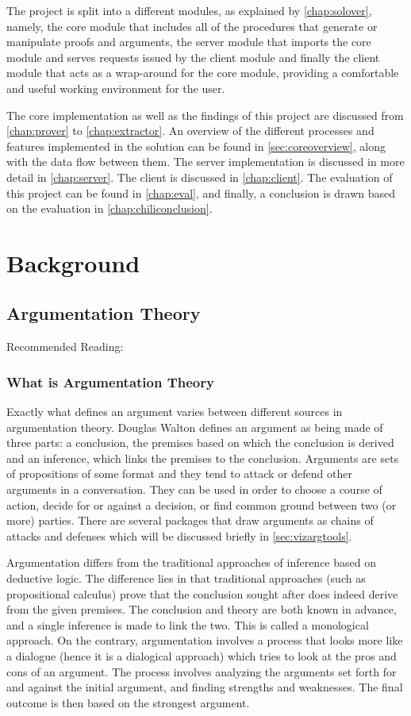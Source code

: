 \documentclass[11pt,twoside,a4paper]{report}
\begin{document}
The project is split into a different modules, as explained by \autoref{chap:solover}, namely, the core module that includes all of the procedures that generate or manipulate proofs and arguments, the server module that imports the core module and serves requests issued by the client module and finally the client module that acts as a wrap-around for the core module, providing a comfortable and useful working environment for the user.

The core implementation as well as the findings of this project are discussed from \autoref{chap:prover} to \autoref{chap:extractor}. An overview of the different processes and features implemented in the solution can be found in \autoref{sec:coreoverview}, along with the data flow between them. The server implementation is discussed in more detail in \autoref{chap:server}. The client is discussed in \autoref{chap:client}. The evaluation of this project can be found in \autoref{chap:eval}, and finally, a conclusion is drawn based on the evaluation in \autoref{chap:chiliconclusion}.

\chapter{Background}
\label{chap:background}

\section{Argumentation Theory}
\label{sec:argtheory}
Recommended Reading: \citep*{argumentationinai}

\subsection{What is Argumentation Theory}
Exactly what defines an argument varies between different sources in argumentation theory. Douglas Walton defines an argument as being made of three parts: a conclusion, the premises based on which the conclusion is derived and an inference, which links the premises to the conclusion. Arguments are sets of propositions of some format and they tend to attack or defend other arguments in a conversation. They can be used in order to choose a course of action, decide for or against a decision, or find common ground between two (or more) parties. There are several packages that draw arguments as chains of attacks and defenses which will be discussed briefly in \autoref{sec:vizargtools}.

Argumentation differs from the traditional approaches of inference based on deductive logic. The difference lies in that traditional approaches (such as propositional calculus) prove that the conclusion sought after does indeed derive from the given premises. The conclusion and theory are both known in advance, and a single inference is made to link the two. This is called a monological approach. On the contrary, argumentation involves a process that looks more like a dialogue (hence it is a dialogical approach) which tries to look at the pros and cons of an argument. The process involves analyzing the arguments set forth for and against the initial argument, and finding strengths and weaknesses. The final outcome is then based on the strongest argument.
\end{document}
